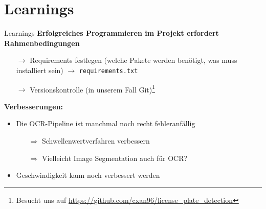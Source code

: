 \section{Learnings}

\begin{frame}{Learnings}
    \textbf{Erfolgreiches Programmieren im Projekt erfordert Rahmenbedingungen}
    \begin{itemize}
        \item[$\rightarrow$] Requirements festlegen (welche Pakete werden ben\"otigt, was muss installiert sein) $\rightarrow$ \texttt{requirements.txt}
        \item[$\rightarrow$] Versionskontrolle (in unserem Fall Git)\footnote{Besucht uns auf \url{https://github.com/cxan96/license_plate_detection}}
    \end{itemize}

    \textbf{Verbesserungen:}
    \begin{itemize}
        \item Die OCR-Pipeline ist manchmal noch recht fehleranf\"allig
              \begin{itemize}
                  \item[$\Rightarrow$] Schwellenwertverfahren verbessern
                  \item[$\Rightarrow$] Vielleicht Image Segmentation auch f\"ur OCR?
              \end{itemize}
        \item Geschwindigkeit kann noch verbessert werden
    \end{itemize}
\end{frame}

